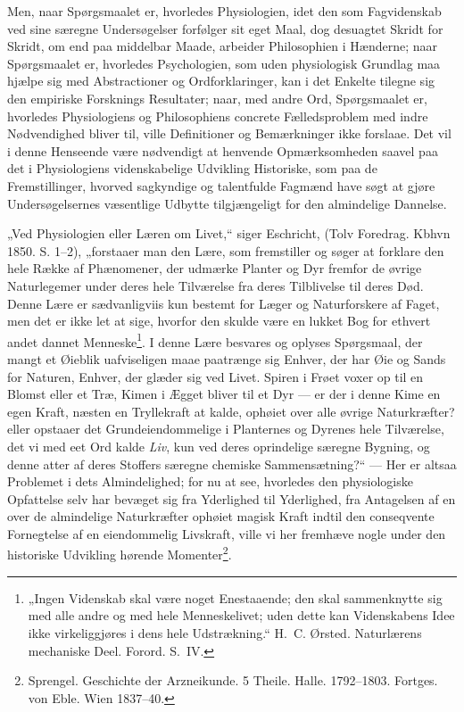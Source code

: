 \documentclass[12pt,a4paper]{book}
\begin{document}
Men, naar Spørgsmaalet er, hvorledes Physiologien, idet den som
Fagvidenskab ved sine særegne Undersøgelser forfølger sit eget Maal,
dog desuagtet Skridt for Skridt, om end paa middelbar Maade, arbeider
Philosophien i Hænderne; naar Spørgsmaalet er, hvorledes Psychologien,
som uden physiologisk Grundlag maa hjælpe sig med Abstractioner og
Ordforklaringer, kan i det Enkelte tilegne sig den empiriske
Forsknings Resultater; naar, med andre Ord, Spørgsmaalet er, hvorledes
Physiologiens og Philosophiens concrete Fælledsproblem med indre
Nødvendighed bliver til, ville Definitioner og Bemærkninger ikke
forslaae. Det vil i denne Henseende være nødvendigt at henvende
Opmærksomheden saavel paa det i Physiologiens videnskabelige
Udvikling Historiske, som paa de Fremstillinger, hvorved sagkyndige
og talentfulde Fagmænd have søgt at gjøre Undersøgelsernes
væsentlige Udbytte tilgjængeligt for den almindelige Dannelse.

\setcounter{footnote}{0}
„Ved Physiologien eller Læren om Livet,“ siger Eschricht, (Tolv
Foredrag. Kbhvn 1850. S. 1--2), „forstaaer man den Lære, som
fremstiller og søger at forklare den hele Række af Phænomener, der
udmærke Planter og Dyr fremfor de øvrige Naturlegemer under deres hele
Tilværelse fra deres Tilblivelse til deres Død. Denne Lære er
sædvanligviis kun bestemt for Læger og Naturforskere af Faget, men
det er ikke let at sige, hvorfor den skulde være en lukket Bog for
ethvert andet dannet Menneske\footnote{„Ingen Videnskab skal være
noget Enestaaende; den skal sammenknytte sig med alle andre og med
hele Menneskelivet; uden dette kan Videnskabens Idee ikke
virkeliggjøres i dens hele Udstrækning.“ H.~C. Ørsted. Naturlærens
mechaniske Deel. Forord. S.~IV.}. I denne Lære besvares
og oplyses Spørgsmaal, der mangt et Øieblik uafviseligen maae
paatrænge sig Enhver, der har Øie og Sands for Naturen, Enhver, der
glæder sig ved Livet. Spiren i Frøet voxer op til en Blomst eller et
Træ, Kimen i Ægget bliver til et Dyr --- er der i denne Kime en egen
Kraft, næsten en Tryllekraft at kalde, ophøiet over alle øvrige
Naturkræfter? eller opstaaer det Grundeiendommelige i Planternes og
Dyrenes hele Tilværelse, det vi med eet Ord kalde \emph{Liv}, kun ved deres
oprindelige særegne Bygning, og denne atter af deres Stoffers
særegne chemiske Sammensætning?“ --- Her er altsaa Problemet i dets
Almindelighed; for nu at see, hvorledes den physiologiske Opfattelse
selv har bevæget sig fra Yderlighed til Yderlighed, fra Antagelsen af
en over de almindelige Naturkræfter ophøiet magisk Kraft indtil den
conseqvente Fornegtelse af en eiendommelig Livskraft, ville vi her
fremhæve nogle under den historiske Udvikling hørende
Momenter\footnote{Sprengel. Geschichte der Arzneikunde. 5 Theile.
Halle. 1792--1803. Fortges. von Eble. Wien 1837--40.}.
\end{document}
